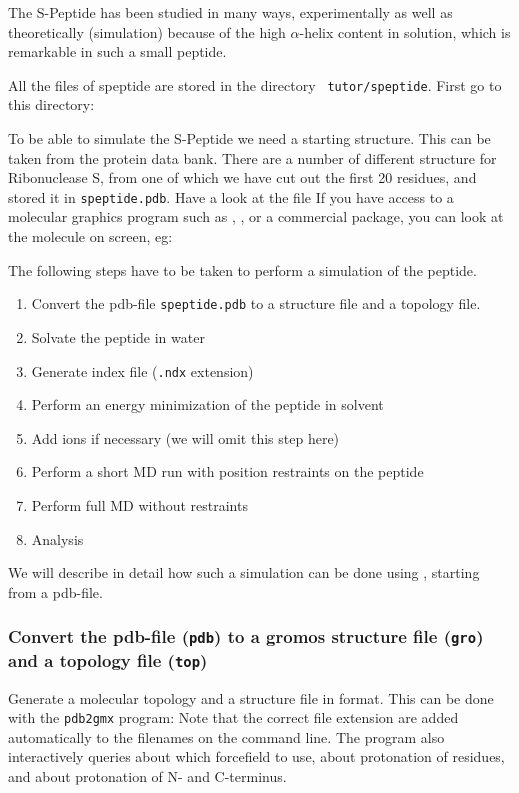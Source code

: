 The S-Peptide has been studied in many ways, experimentally
as well as theoretically (simulation) because of the high $\alpha$-helix 
content in solution, which is remarkable in such a small peptide.

All the files of speptide are stored in the directory {\tt
tutor/speptide}. First go to this directory:  

To be able to simulate the S-Peptide we need a starting structure. This can
be taken from the protein data bank. There are a number of different
structure for Ribonuclease S, from one of which we have cut out the
first 20 residues, and stored it in {\tt speptide.pdb}. Have a look at the
file  If you have access to a molecular
graphics program such as , , 
or a commercial package,
you can look at the molecule on screen, eg: 

The following steps have to be taken to perform a simulation of the peptide.
\begin{enumerate}
\item	Convert the pdb-file {\tt speptide.pdb} to a {\gromacs} structure
	file and a {\gromacs} topology file.
\item	Solvate the peptide in water
\item   Generate index file ({\tt .ndx} extension)
\item	Perform an energy minimization of the peptide in solvent
\item	Add ions if necessary (we will omit this step here)
\item	Perform a short MD run with position restraints on the peptide
\item	Perform full MD without restraints
\item	Analysis
\end{enumerate}

We will describe in detail how such a simulation can be done using
{\gromacs}, starting from a pdb-file.

\subsubsection{Convert the pdb-file ({\tt pdb}) to a gromos structure file ({\tt gro}) and a topology file ({\tt top})}

Generate a molecular topology and a structure file in {\gromacs}
format. This can be done with the {\tt pdb2gmx} program: 
Note that the correct file extension are added automatically to the
filenames on the command line. The program also interactively queries
about which forcefield to use, about protonation of residues, and
about protonation of N- and C-terminus. 

